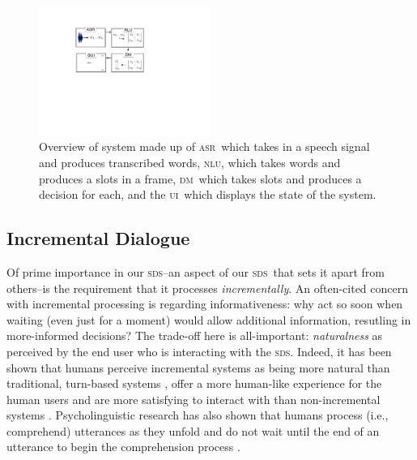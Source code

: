 \documentclass[11pt]{article}
\newcommand{\sds}[0]{\textsc{sds}}
\newcommand{\nlu}[0]{\textsc{nlu}}
\newcommand{\asr}[0]{\textsc{asr}}
\newcommand{\dm}[0]{\textsc{dm}}
\newcommand{\ui}[0]{\textsc{ui}}
\begin{document}
\begin{figure}[ht]
  \centering
      \includegraphics[width=0.5\textwidth]{figures/sig16-overview.pdf}	
      \caption{Overview of system made up of \asr\ which takes in a speech signal and produces transcribed words, \nlu, which takes words and produces a slots in a frame, \dm\ which takes slots and produces a decision for each, and the \ui\ which displays the state of the system. \label{fig:overview}}
\end{figure}


\subsection{Incremental Dialogue}

Of prime importance in our \sds--an aspect of our \sds\ that sets it apart from others--is the requirement that it processes \emph{incrementally}. An often-cited concern with incremental processing is regarding informativeness: why act so soon when waiting (even just for a moment) would allow additional information, resutling in more-informed decisions? The trade-off here is all-important: \emph{naturalness} as perceived by the end user who is interacting with the \sds. Indeed, it has been shown that humans perceive incremental systems as being more natural than traditional, turn-based systems \cite{Aist2006,Skantze2009,skantze2010sigdial,Asri2014}, offer a more human-like experience for the human users \cite{Edlund2008b} and are more satisfying to interact with than non-incremental systems \cite{Aistetal:incrunder-short}. Psycholinguistic research has also shown that humans process (i.e., comprehend) utterances as they unfold and do not wait until the end of an utterance to begin the comprehension process \cite{Tanenhaus1995,Spivey_2002tw}. 
\end{document}
